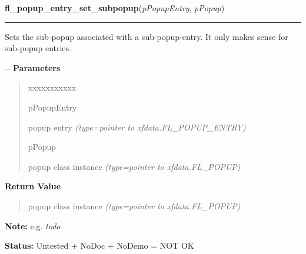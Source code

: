 \hspace{.8\funcindent}\begin{boxedminipage}{\funcwidth}

    \raggedright \textbf{fl\_popup\_entry\_set\_subpopup}(\textit{pPopupEntry}, \textit{pPopup})

    \vspace{-1.5ex}

    \rule{\textwidth}{0.5\fboxrule}
\setlength{\parskip}{2ex}

Sets the sub-popup associated with a sub-popup-entry. It only makes
sense for sub-popup entries.

-{}-
\setlength{\parskip}{1ex}
      \textbf{Parameters}
      \vspace{-1ex}

      \begin{quote}
        \begin{Ventry}{xxxxxxxxxxx}

          \item[pPopupEntry]


popup entry
            {\it (type=pointer to xfdata.FL\_POPUP\_ENTRY)}

          \item[pPopup]


popup class instance
            {\it (type=pointer to xfdata.FL\_POPUP)}

        \end{Ventry}

      \end{quote}

      \textbf{Return Value}
    \vspace{-1ex}

      \begin{quote}

popup class instance
      {\it (type=pointer to xfdata.FL\_POPUP)}

      \end{quote}

\textbf{Note:} 
e.g. \emph{todo}


\textbf{Status:} 
Untested + NoDoc + NoDemo = NOT OK


    \end{boxedminipage}

    \label{xformslib:flpopup:fl_popup_get_size}

    \vspace{0.5ex}

